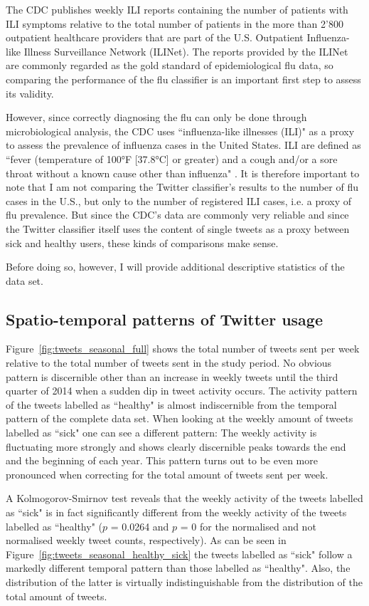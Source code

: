 \documentclass[11pt, a4paper,twoside]{report}\usepackage[]{graphicx}\usepackage[]{color}
\begin{document}
The CDC publishes weekly ILI reports containing the number of patients with ILI symptoms relative to the total number of patients in the more than 2'800 outpatient healthcare providers that are part of the U.S. Outpatient Influenza-like Illness Surveillance Network (ILINet). The reports provided by the ILINet are commonly regarded as the gold standard of epidemiological flu data, so comparing the performance of the flu classifier is an important first step to assess its validity. 

However, since correctly diagnosing the flu can only be done through microbiological analysis, the CDC uses ``influenza-like illnesses (ILI)" as a proxy to assess the prevalence of influenza cases in the United States. ILI are defined as ``fever (temperature of 100°F [37.8°C] or greater) and a cough and/or a sore throat without a known cause other than influenza" \citep{cdc_surveillance_2016}. It is therefore important to note that I am not comparing the Twitter classifier's results to the number of flu cases in the U.S., but only to the number of registered ILI cases, i.e. a proxy of flu prevalence. But since the CDC's data are commonly very reliable and since the Twitter classifier itself uses the content of single tweets as a proxy between sick and healthy users, these kinds of comparisons make sense. 

Before doing so, however, I will provide additional descriptive statistics of the data set.

\subsection{Spatio-temporal patterns of Twitter usage}

Figure~\ref{fig:tweets_seasonal_full} shows the total number of tweets sent per week relative to the total number of tweets sent in the study period. No obvious pattern is discernible other than an increase in weekly tweets until the third quarter of 2014 when a sudden dip in tweet activity occurs. The activity pattern of the tweets labelled as ``healthy" is almost indiscernible from the temporal pattern of the complete data set. When looking at the weekly amount of tweets labelled as ``sick" one can see a different pattern: The weekly activity is fluctuating more strongly and shows clearly discernible peaks towards the end and the beginning of each year. This pattern turns out to be even more pronounced when correcting for the total amount of tweets sent per week. 

A Kolmogorov-Smirnov test reveals that the weekly activity of the tweets labelled as ``sick" is in fact significantly different from the weekly activity of the tweets labelled as ``healthy" ($p$ = 0.0264 and $p$ = 0 for the normalised and not normalised weekly tweet counts, respectively). As can be seen in Figure~\ref{fig:tweets_seasonal_healthy_sick} the tweets labelled as ``sick" follow a markedly different temporal pattern than those labelled as ``healthy". Also, the distribution of the latter is virtually indistinguishable from the distribution of the total amount of tweets.
\end{document}
